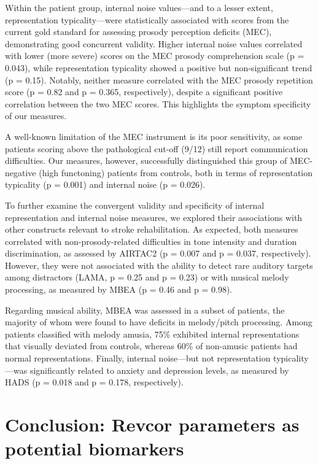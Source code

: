 Within the patient group, internal noise values—and to a lesser extent, representation typicality—were statistically associated with scores from the current gold standard for assessing prosody perception deficits (MEC), demonstrating good concurrent validity. Higher internal noise values correlated with lower (more severe) scores on the MEC prosody comprehension scale (p = 0.043), while representation typicality showed a positive but non-significant trend (p = 0.15). Notably, neither measure correlated with the MEC prosody repetition score (p = 0.82 and p = 0.365, respectively), despite a significant positive correlation between the two MEC scores. This highlights the symptom specificity of our measures.

A well-known limitation of the MEC instrument is its poor sensitivity, as some patients scoring above the pathological cut-off (9/12) still report communication difficulties. Our measures, however, successfully distinguished this group of MEC-negative (high functoning) patients from controls, both in terms of representation typicality (p = 0.001) and internal noise (p = 0.026).

To further examine the convergent validity and specificity of internal representation and internal noise measures, we explored their associations with other constructs relevant to stroke rehabilitation. As expected, both measures correlated with non-prosody-related difficulties in tone intensity and duration discrimination, as assessed by AIRTAC2 (p = 0.007 and p = 0.037, respectively). However, they were not associated with the ability to detect rare auditory targets among distractors (LAMA, p = 0.25 and p = 0.23) or with musical melody processing, as measured by MBEA (p = 0.46 and p = 0.98).

Regarding musical ability, MBEA was assessed in a subset of patients, the majority of whom were found to have deficits in melody/pitch processing. Among patients classified with melody amusia, 75\% exhibited internal representations that visually deviated from controls, whereas 60\% of non-amusic patients had normal representations. Finally, internal noise—but not representation typicality—was significantly related to anxiety and depression levels, as measured by HADS (p = 0.018 and p = 0.178, respectively).




\section {Conclusion: Revcor parameters as potential biomarkers} 

